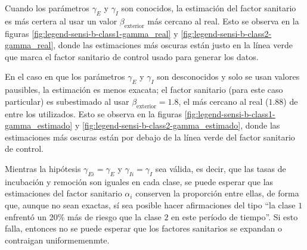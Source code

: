 Cuando los parámetros \(\gamma_E\) y \(\gamma_I\) son conocidos, la estimación del factor sanitario es más certera al usar un valor \(\beta_{\text{exterior}}\) más cercano al real. Esto se observa en la figuras \ref{fig:legend-sensi-b-class1-gamma_real} y \ref{fig:legend-sensi-b-class2-gamma_real}, donde las estimaciones más oscuras están justo en la línea verde que marca el factor sanitario de control usado para generar los datos.

En el caso en que los parámetros \(\gamma_E\) y \(\gamma_I\) son desconocidos y solo se usan valores pausibles, la estimación es menos exacata; el factor sanitario (para este caso particular) es subestimado al usar \(\beta_{\text{exterior}} = 1.8\), el más cercano al real (\(1.88\)) de entre los utilizados. Esto se observa en la figuras \ref{fig:legend-sensi-b-class1-gamma_estimado} y \ref{fig:legend-sensi-b-class2-gamma_estimado}, donde las estimaciones más oscuras están por debajo de la línea verde del factor sanitario de control.


Mientras la hipótesis \(\gamma_{Ei} = \gamma_E\) y \(\gamma_{Ii} = \gamma_I\) sea válida, es decir, que las tasas de incubación y remoción son iguales en cada clase, se puede esperar que las estimaciones del factor sanitario \(\alpha_i\) conserven la proporción entre ellas, de forma que, aunque no sean exactas, sí sea posible hacer afirmaciones del tipo ``la clase \(1\) enfrentó un 20\% más de riesgo que la clase \(2\) en este período de tiempo''. Si esto falla, entonces no se puede esperar que los factores sanitarios se expandan o contraigan uniformemenmte.







